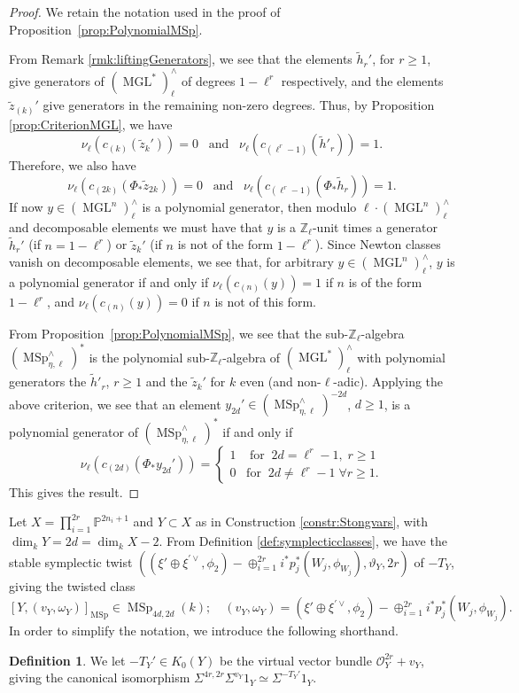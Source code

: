 \documentclass[10pt]{amsart}
\theoremstyle{definition}
\newtheorem{defn}{Definition}[section]
\theoremstyle{plain}
\numberwithin{equation}{section}
\newcommand{\0}{\emptyset}
\newcommand{\Z}{{\mathbb Z}}
\newcommand{\MGL}{{\operatorname{MGL}}}
\newcommand{\MSp}{{\operatorname{MSp}}}
\renewcommand{\dim}{{\operatorname{dim}}}
\begin{document}
\begin{proof} We retain the notation used in the proof of Proposition~\ref{prop:PolynomialMSp}. 

From Remark \ref{rmk:liftingGenerators}, we see that the elements $\tilde{h}_r'$, for $r \ge 1$, give generators of $(\MGL^*)^\wedge_\ell$ of degrees $1-\ell^r$ respectively, and the elements $\tilde{z}_{(k)}'$ give generators in the remaining non-zero degrees. Thus, by Proposition \ref{prop:CriterionMGL}, we have
$$\nu_\ell(c_{(k)}(\tilde{z}_k'))=0 \; \; \; \text{and} \; \; \; \nu_\ell(c_{(\ell^r-1)}(\tilde{h}'_r))=1.$$
Therefore, we also have 
\begin{equation}
\label{eq:l-adic}
    \nu_\ell(c_{(2k)}(\Phi_* \tilde{z}_{2k}))=0 \; \; \; \text{and} \; \; \; \nu_\ell(c_{(\ell^r-1)}(\Phi_* \tilde{h}_r))=1.
\end{equation}
If now $y\in (\MGL^n)^\wedge_\ell$ is a polynomial generator, then modulo $\ell\cdot (\MGL^n)^\wedge_\ell$ and decomposable elements we must have that $y$ is a $\Z_\ell$-unit times a generator $\tilde{h}_r'$ (if $n=1-\ell^r$) or $\tilde{z}_k'$ (if $n$ is not of the form $1-\ell^r$). Since Newton classes vanish on decomposable elements, we see that, for arbitrary $y\in (\MGL^n)^\wedge_\ell$, $y$ is a polynomial generator if and only if $\nu_\ell(c_{(n)}(y))=1$ if $n$ is of the form  $1-\ell^r$, and $\nu_\ell(c_{(n)}(y))=0$ if $n$ is not of this form. 

From Proposition~\ref{prop:PolynomialMSp}, we see that the sub-$\Z_\ell$-algebra $(\MSp^\wedge_{\eta,\ell})^*$ is the polynomial sub-$\Z_\ell$-algebra of $(\MGL^*)^\wedge_\ell$
with polynomial generators the $\tilde{h}'_r$, $r\ge1$ and the $\tilde{z}_k'$ for $k$ even (and non-$\ell$-adic). Applying the above criterion, we see that an element $y_{2d}' \in (\MSp^\wedge_{\eta,\ell})^{-2d}$, $d \ge 1$, is a polynomial generator of $(\MSp^\wedge_{\eta,\ell})^*$ if and only if  
 $$
 \nu_\ell(c_{(2d)}(\Phi_* y_{2d}'))=
        \begin{cases}
            1 \; \; \; \; \text{for} \; \; 2d= \ell^r-1, \; r\ge 1 \\
            0 \; \; \; \text{for} \; \; 2d \neq \ell^r-1 \; \forall r \ge 1.
        \end{cases}
$$
This gives the result.
\end{proof}

Let $X=\prod_{i=1}^{2r}\mathbb{P}^{2n_i +1}$ and $Y\subset X$ as in Construction \ref{constr:Stongvars}, with $\dim_kY=2d=\dim_kX-2$. From Definition \ref{def:symplecticclasses}, we have the stable symplectic twist  $((\xi'\oplus \xi^{\prime\vee},\phi_2)-\oplus_{i=1}^{2r}i^*p_j^*(W_j, \phi_{W_j}), \vartheta_Y, 2r)$ of $-T_Y$, giving the twisted class
\[
 [Y,(v_Y,\omega_Y)]_{\MSp} \in \MSp_{4d,2d}(k);\quad (v_Y,\omega_Y)=
 (\xi'\oplus \xi^{\prime\vee},\phi_2)-\oplus_{i=1}^{2r}i^*p_j^*(W_j, \phi_{W_j}).
 \]
  In order to simplify the notation, we introduce the following shorthand.
 \begin{defn}
 \label{defn:convention}
 We let $-T_Y'\in K_0(Y)$ be the virtual vector bundle $\mathcal{O}_Y^{2r}+v_Y$, giving the canonical isomorphism $\Sigma^{4r, 2r}\Sigma^{v_Y}1_Y \simeq \Sigma^{-T_Y'}1_Y$.
 \end{defn} 
\end{document}
